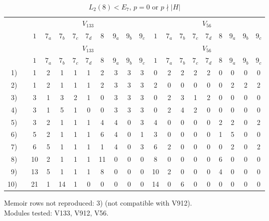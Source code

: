 \setcounter{table}{163}
\begin{longtable}{rc|ccccccccc|ccccccccc}
\caption{$L_2(8) < E_7$, $p = 0$ or $p \nmid |H|$}\\
& & \multicolumn{9}{c|}{$V_{133}$} & \multicolumn{9}{c}{$V_{56}$} \\
& & $1$ & $7_{a}$ & $7_{b}$ & $7_{c}$ & $7_{d}$ & $8$ & $9_{a}$ & $9_{b}$ & $9_{c}$ & $1$ & $7_{a}$ & $7_{b}$ & $7_{c}$ & $7_{d}$ & $8$ & $9_{a}$ & $9_{b}$ & $9_{c}$ \\ \hline
\endfirsthead
& & \multicolumn{9}{c|}{$V_{133}$} & \multicolumn{9}{c}{$V_{56}$} \\
& & $1$ & $7_{a}$ & $7_{b}$ & $7_{c}$ & $7_{d}$ & $8$ & $9_{a}$ & $9_{b}$ & $9_{c}$ & $1$ & $7_{a}$ & $7_{b}$ & $7_{c}$ & $7_{d}$ & $8$ & $9_{a}$ & $9_{b}$ & $9_{c}$ \\ \hline
\endhead
1) &  & 1 & 2 & 1 & 1 & 1 & 2 & 3 & 3 & 3 & 0 & 2 & 2 & 2 & 2 & 0 & 0 & 0 & 0 \\
2) &  & 1 & 2 & 1 & 1 & 1 & 2 & 3 & 3 & 3 & 2 & 0 & 0 & 0 & 0 & 0 & 2 & 2 & 2 \\
3) &  & 3 & 1 & 3 & 2 & 1 & 0 & 3 & 3 & 3 & 0 & 2 & 3 & 1 & 2 & 0 & 0 & 0 & 0 \\
4) &  & 3 & 1 & 5 & 1 & 0 & 0 & 3 & 3 & 3 & 0 & 2 & 4 & 2 & 0 & 0 & 0 & 0 & 0 \\
5) &  & 3 & 2 & 1 & 1 & 1 & 4 & 4 & 0 & 3 & 4 & 0 & 0 & 0 & 0 & 2 & 2 & 0 & 2 \\
6) &  & 5 & 2 & 1 & 1 & 1 & 6 & 4 & 0 & 1 & 3 & 0 & 0 & 0 & 0 & 1 & 5 & 0 & 0 \\
7) &  & 6 & 5 & 1 & 1 & 1 & 1 & 4 & 0 & 3 & 6 & 2 & 0 & 0 & 0 & 0 & 2 & 0 & 2 \\
8) &  & 10 & 2 & 1 & 1 & 1 & 11 & 0 & 0 & 0 & 8 & 0 & 0 & 0 & 0 & 6 & 0 & 0 & 0 \\
9) &  & 13 & 5 & 1 & 1 & 1 & 8 & 0 & 0 & 0 & 10 & 2 & 0 & 0 & 0 & 4 & 0 & 0 & 0 \\
10) &  & 21 & 1 & 14 & 1 & 0 & 0 & 0 & 0 & 0 & 14 & 0 & 6 & 0 & 0 & 0 & 0 & 0 & 0 \\
\end{longtable}
\noindent Memoir rows not reproduced: 3) (not compatible with V912).\\
Modules tested: V133, V912, V56.\\

